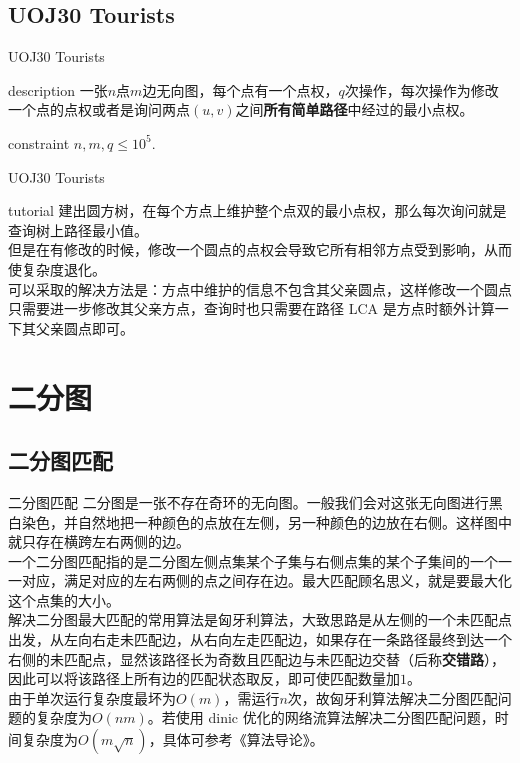 \documentclass{beamer}
\begin{document}
\subsection{UOJ30 Tourists}
\begin{frame}{UOJ30 Tourists}
	\begin{block}{description}
		一张$n$点$m$边无向图，每个点有一个点权，$q$次操作，每次操作为修改一个点的点权或者是询问两点$(u,v)$之间\textbf{所有简单路径}中经过的最小点权。
	\end{block}
	\begin{block}{constraint}
		$n, m, q \le 10^5.$
	\end{block}
\end{frame}
\begin{frame}{UOJ30 Tourists}
	\begin{block}{tutorial}
		建出圆方树，在每个方点上维护整个点双的最小点权，那么每次询问就是查询树上路径最小值。\\
		
		但是在有修改的时候，修改一个圆点的点权会导致它所有相邻方点受到影响，从而使复杂度退化。\\
		
		可以采取的解决方法是：方点中维护的信息不包含其父亲圆点，这样修改一个圆点只需要进一步修改其父亲方点，查询时也只需要在路径 LCA 是方点时额外计算一下其父亲圆点即可。
	\end{block}
\end{frame}

\section{二分图}
\subsection{二分图匹配}
\begin{frame}{二分图匹配}
	二分图是一张不存在奇环的无向图。一般我们会对这张无向图进行黑白染色，并自然地把一种颜色的点放在左侧，另一种颜色的边放在右侧。这样图中就只存在横跨左右两侧的边。\\
	
	一个二分图匹配指的是二分图左侧点集某个子集与右侧点集的某个子集间的一个一一对应，满足对应的左右两侧的点之间存在边。最大匹配顾名思义，就是要最大化这个点集的大小。\\
	
	解决二分图最大匹配的常用算法是匈牙利算法，大致思路是从左侧的一个未匹配点出发，从左向右走未匹配边，从右向左走匹配边，如果存在一条路径最终到达一个右侧的未匹配点，显然该路径长为奇数且匹配边与未匹配边交替（后称\textbf{交错路}），因此可以将该路径上所有边的匹配状态取反，即可使匹配数量加$1$。\\
	
	由于单次运行复杂度最坏为$O(m)$，需运行$n$次，故匈牙利算法解决二分图匹配问题的复杂度为$O(nm)$。若使用 dinic 优化的网络流算法解决二分图匹配问题，时间复杂度为$O(m\sqrt n)$，具体可参考《算法导论》。
	
\end{frame}
\end{document}
